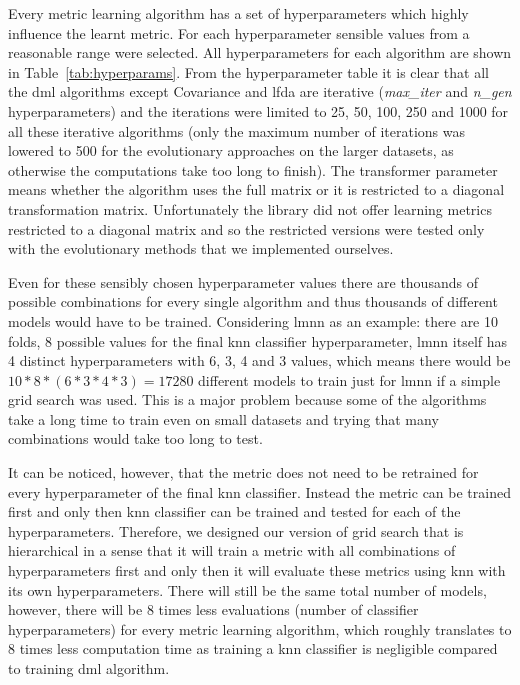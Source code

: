 \documentclass[12pt,a4paper]{report}
\begin{document}
Every metric learning algorithm has a set of hyperparameters which highly influence the learnt metric. For each hyperparameter sensible values from a reasonable range were selected. All hyperparameters for each algorithm are shown in Table~\ref{tab:hyperparams}. From the hyperparameter table it is clear that all the \ac{dml} algorithms except Covariance and \ac{lfda} are iterative (\textit{max\_iter} and \textit{n\_gen} hyperparameters) and the iterations were limited to 25, 50, 100, 250 and 1000 for all these iterative algorithms (only the maximum number of iterations was lowered to 500 for the evolutionary approaches on the larger datasets, as otherwise the computations take too long to finish). The transformer parameter means whether the algorithm uses the full matrix or it is restricted to a diagonal transformation matrix. Unfortunately the library did not offer learning metrics restricted to a diagonal matrix and so the restricted versions were tested only with the evolutionary methods that we implemented ourselves.



Even for these sensibly chosen hyperparameter values there are thousands of possible combinations for every single algorithm and thus thousands of different models would have to be trained. Considering \ac{lmnn} as an example: there are 10 folds, 8 possible values for the final \ac{knn} classifier hyperparameter, \ac{lmnn} itself has 4 distinct hyperparameters with 6, 3, 4 and 3 values, which means there would be $10*8*(6*3*4*3)=17280$ different models to train just for \ac{lmnn} if a simple grid search was used. This is a major problem because some of the algorithms take a long time to train even on small datasets and trying that many combinations would take too long to test.

It can be noticed, however, that the metric does not need to be retrained for every hyperparameter of the final \ac{knn} classifier. Instead the metric can be trained first and only then \ac{knn} classifier can be trained and tested for each of the hyperparameters. Therefore, we designed our version of grid search that is hierarchical in a sense that it will train a metric with all combinations of hyperparameters first and only then it will evaluate these metrics using \ac{knn} with its own hyperparameters. There will still be the same total number of models, however, there will be 8 times less evaluations (number of classifier hyperparameters) for every metric learning algorithm, which roughly translates to 8 times less computation time as training a \ac{knn} classifier is negligible compared to training \ac{dml} algorithm.
\end{document}
